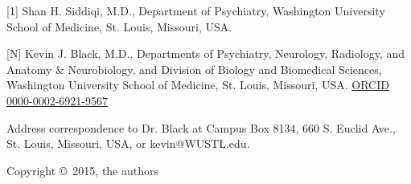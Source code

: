 [1] Shan H. Siddiqi, M.D., Department of Psychiatry, Washington University School of Medicine, St. Louis, Missouri, USA.

[N] Kevin J. Black, M.D., Departments of Psychiatry, Neurology, Radiology, and Anatomy \& Neurobiology, and Division of Biology and Biomedical Sciences, Washington University School of Medicine, St. Louis, Missouri, USA.  \href{http://orcid.org/0000-0002-6921-9567}{ORCID 0000-0002-6921-9567}

Address correspondence to Dr. Black at Campus Box 8134, 660 S. Euclid Ave., St. Louis, Missouri, USA, or kevin@WUSTL.edu.

Copyright \copyright\, 2015, the authors